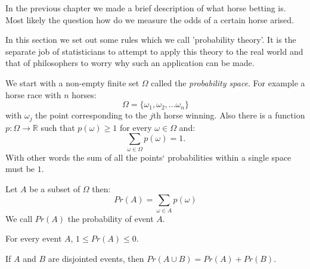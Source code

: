 In the previous chapter we made a brief description of what horse betting is. Most likely the question how do we measure the odds of a certain horse arised.

In this section we set out some rules which we call 'probability theory'. It is the separate job of statisticians to attempt to apply this theory to the real world and that of philosophers to worry why such an application can be made.

We start with a non-empty finite set $\Omega$ called the \textit{probability space}. For example a horse race with $n$ horses:
\[ \Omega = \lbrace \omega_1, \omega_2, ... \omega_n \rbrace \]
with $\omega_j$ the point corresponding to the $j$th horse winning.
Also there is a function $p : \Omega \rightarrow \mathbb{R}$ such that $p(\omega)\geq 1$ for every $\omega\in\Omega$ and:
\[ \sum\limits_{\omega\in\Omega} p(\omega) = 1. \]
With other words the sum of all the points` probabilities within a single space must be $1$.

Let $A$ be a subset of $\Omega$ then:
\[ Pr(A) = \sum\limits_{\omega\in A} p(\omega) \]
We call $Pr(A)$ the probability of event $A$.

\begin{list}{•}{\textbf{Properties}:}
	\item For every event $A$, $1 \leq Pr(A) \leq 0$.
	\item If $A$ and $B$ are disjointed events, then $Pr(A\cup B) = Pr(A) + Pr(B)$.
\end{list}